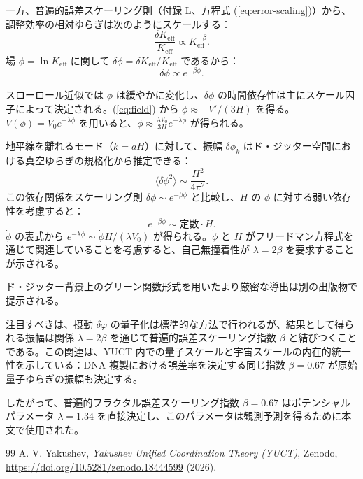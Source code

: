 \documentclass[11pt,a4paper]{article}
\theoremstyle{remark}
\newcommand{\Keff}{K_{\mathrm{eff}}}
\begin{document}
	一方、普遍的誤差スケーリング則（付録 L、方程式 (\ref{eq:error-scaling})）から、調整効率の相対ゆらぎは次のようにスケールする：
	\begin{equation}
		\frac{\delta\Keff}{\Keff} \propto \Keff^{-\beta}.
	\end{equation}
	場 $\phi = \ln\Keff$ に関して $\delta\phi = \delta\Keff/\Keff$ であるから：
	\begin{equation}
		\delta\phi \propto e^{-\beta\phi}.
	\end{equation}
	
	スローロール近似では $\dot{\phi}$ は緩やかに変化し、$\delta\phi$ の時間依存性は主にスケール因子によって決定される。(\ref{eq:field}) から $\dot{\phi} \approx -V'/(3H)$ を得る。$V(\phi) = V_0 e^{-\lambda\phi}$ を用いると、$\dot{\phi} \approx \frac{\lambda V_0}{3H} e^{-\lambda\phi}$ が得られる。
	
	地平線を離れるモード（$k = aH$）に対して、振幅 $\delta\phi_k$ はド・ジッター空間における真空ゆらぎの規格化から推定できる：
	\begin{equation}
		\langle \delta\phi^2 \rangle \sim \frac{H^2}{4\pi^2}.
	\end{equation}
	この依存関係をスケーリング則 $\delta\phi \sim e^{-\beta\phi}$ と比較し、$H$ の $\phi$ に対する弱い依存性を考慮すると：
	\begin{equation}
		e^{-\beta\phi} \sim \text{定数} \cdot H.
	\end{equation}
	$\dot{\phi}$ の表式から $e^{-\lambda\phi} \sim \dot{\phi} H / (\lambda V_0)$ が得られる。$\dot{\phi}$ と $H$ がフリードマン方程式を通じて関連していることを考慮すると、自己無撞着性が $\lambda = 2\beta$ を要求することが示される。
	
	ド・ジッター背景上のグリーン関数形式を用いたより厳密な導出は別の出版物で提示される。
	
	注目すべきは、摂動 $\delta\varphi$ の量子化は標準的な方法で行われるが、結果として得られる振幅は関係 $\lambda = 2\beta$ を通じて普遍的誤差スケーリング指数 $\beta$ と結びつくことである。この関連は、YUCT 内での量子スケールと宇宙スケールの内在的統一性を示している：DNA 複製における誤差率を決定する同じ指数 $\beta = 0.67$ が原始量子ゆらぎの振幅も決定する。
	
	したがって、普遍的フラクタル誤差スケーリング指数 $\beta = 0.67$ はポテンシャルパラメータ $\lambda = 1.34$ を直接決定し、このパラメータは観測予測を得るために本文で使用された。
	
	\begin{thebibliography}{99}
		A. V. Yakushev, \emph{Yakushev Unified Coordination Theory (YUCT)}, Zenodo, \url{https://doi.org/10.5281/zenodo.18444599} (2026).
	\end{thebibliography}
	
\end{document}
